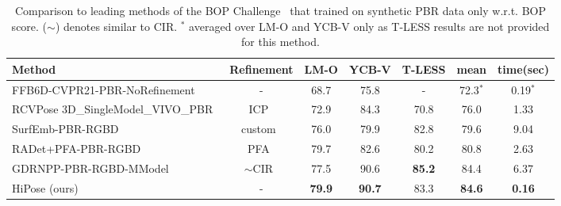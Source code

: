 \begin{table*}
  \centering
  \begin{tabular}{l|c|c|c|c|c|c}
    \toprule
     \textbf{Method} & Refinement & LM-O & YCB-V & T-LESS & mean & time(sec) \\
    \midrule
    FFB6D-CVPR21-PBR-NoRefinement~\cite{he2021ffb6d} &  - & 68.7 &  75.8  & - & 72.3$^*$ & 0.19$^*$\\
    RCVPose 3D\_SingleModel\_VIVO\_PBR~\cite{wu2022vote} &  ICP~\cite{Rusinkiewicz2001EfficientVO} & 72.9 &  84.3  & 70.8 & 76.0 & 1.33\\
    SurfEmb-PBR-RGBD~\cite{Haugaard2021SurfEmbDA} &  custom~\cite{Haugaard2021SurfEmbDA} & 76.0 &  79.9  & 82.8 & 79.6 & 9.04\\
    RADet+PFA-PBR-RGBD~\cite{Hai2023RigidityAwareDF} &  PFA~\cite{hu2022perspective} & 79.7 &  82.6  & 80.2 & 80.8 & 2.63\\
    GDRNPP-PBR-RGBD-MModel~\cite{liu2022gdrnpp_bop} &  $\sim$CIR~\cite{lipson2022coupled} & 77.5 &  90.6  & \textbf{85.2} & 84.4 & 6.37\\
    HiPose (ours) &  - & \textbf{79.9} &  \textbf{90.7}   & 83.3 & \textbf{84.6} & \textbf{0.16}\\
    \bottomrule
  \end{tabular}
  \caption{Comparison to leading methods of the BOP Challenge~\cite{Sundermeyer2023BOPC2} that trained on synthetic PBR data only w.r.t. BOP score.  ($\sim$) denotes similar to CIR\cite{lipson2022coupled}. $^*$ averaged over LM-O and YCB-V only as T-LESS results are not provided for this method.}
  \label{tab:bop_score_table}
\end{table*}



